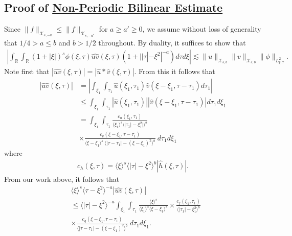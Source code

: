 \documentclass[12pt,reqno]{amsart}
\numberwithin{equation}{section}  %
\newcommand{\rr}{\mathbb{R}}
\newcommand{\wh}{\widehat}
\begin{document}
\subsection{Proof of \hyperref[prop:bilin-est-real]{Non-Periodic Bilinear Estimate}} 
%
\label{sec:bilin-est-real}
Since $\| f \|_{\mathcal{X}_{s,-a}} \le \| f \|_{\mathcal{X}_{s, -a'}}$ for $a \ge a' \ge 0$, we assume
without loss of generality that $1/4 > a \le b$ and $b > 1/2$ throughout. 
By duality, it suffices to show that 
%
\begin{equation}
	\label{duality-est-real}
	\begin{split}
    |	\int_{\rr} \int_{\rr} (1 + |\xi|)^{s}
		\phi(\xi, \tau) \wh{uv}(\xi, \tau)(1 
    + | |\tau| - \xi^{2} |^{-a}) d \tau d \xi | \lesssim \|u\|_{\mathcal{X}_{s,b}}
    \|v\|_{\mathcal{X}_{s,b}}
    \|\phi \|_{L^{2}_{\xi, \tau}}.
	\end{split}
\end{equation}
Note first that $|\wh{uv}(\xi, \tau) |  = | \wh{u} *  \wh{v} 
(\xi, \tau)|$. From this it follows that
%
%
\begin{equation}
	\label{non-lin-rep-real}
	\begin{split}
		| \wh{uv}(\xi, \tau)|
    & = | \int_{\xi_{1}}  \int_{\tau_{1}}
    \wh{u}\left( \xi_1,  \tau_1 \right) \wh{v}\left( \xi - \xi_1 , \tau - \tau_1   
\right) d \tau_1 |
\\
& \le  \int_{\xi_{1}}  \int_{\tau_{1}}
    |\wh{u}\left( \xi_1,  \tau_1 \right)| |\wh{v}\left( \xi - \xi_1 , \tau - \tau_1   
    \right)| d \tau_1 d \xi_{1}
\\
& = \int_{\xi_1} \int_{\tau_{1}} \frac{c_u\left( \xi_1, \tau_1 
\right)}{\langle \xi_1 \rangle ^s \langle |\tau_1| - \xi_1^{2} | \rangle ^{b}}
\\
& \times \frac{c_{v}\left( \xi - \xi_1, \tau - \tau_1 \right)}{\langle \xi -
\xi_1 \rangle ^s\ \langle |\tau - \tau_1 | -  (\xi - \xi_1)^{2} \rangle^{b}}
\ d \tau_1 d \xi_{1}
\end{split}
\end{equation}
%
%
where 
\begin{equation*}
	\begin{split}
		c_h(\xi, \tau) =
			\langle \xi \rangle ^s \langle |\tau| - \xi^{2} \rangle ^{b} | \wh{h}\left( \xi, \tau \right) |.
	\end{split}
\end{equation*}
%
%
From our work above, it follows that 
%
%
\begin{equation}
	\label{convo-est-starting-pnt-real}
	\begin{split}
		 & \langle \xi \rangle^s \langle \tau - \xi^{2} \rangle^{-a} | \wh{uv}\left( 
		\xi, \tau \right) |
		\\
		& \le \langle |\tau| - \xi^{2} \rangle^{-a}
    \int_{\xi_1} \int_{\tau_{1}} \frac{\langle \xi \rangle^{s}}{\langle \xi_1 \rangle^s
    \langle \xi - \xi_1 \rangle^s} 
		\times \frac{c_f(\xi_1, \tau_1)}{\langle |\tau_1| - \xi_1^{2} \rangle ^{b}}
		\\
		& \times
		\frac{c_g(\xi - \xi_1, \tau - \tau_1 )}{\langle |\tau - \tau_1| - (\xi - \xi_1)^{2}
    \rangle^{b}}\ d \tau_1 d \xi_{1}.
	\end{split}
\end{equation}
\end{document}
